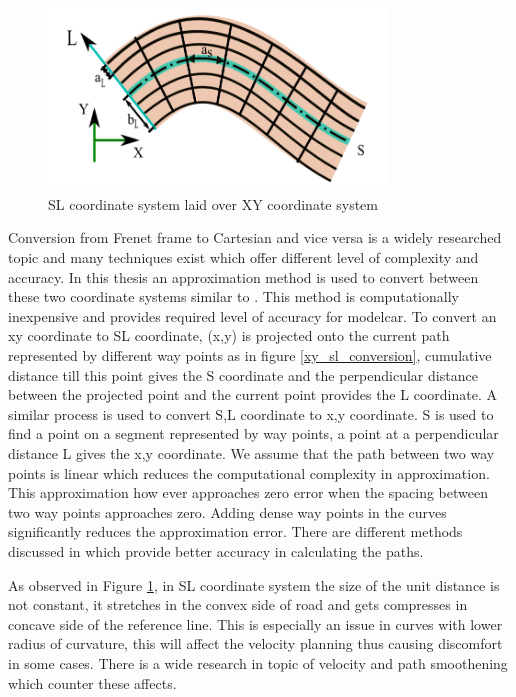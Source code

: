  \begin{figure}[H]
    \centering
    \includegraphics[width=0.8\textwidth]{Images/sl_over_xy.png}
    \caption{SL coordinate system laid over XY coordinate system}
    \label{sl_over_xy}
\end{figure}
 
 Conversion from Frenet frame to Cartesian and vice versa is a widely researched topic and many techniques exist which offer different level of complexity and accuracy. In this thesis an approximation method is used to convert between these two coordinate systems similar to \cite{volvo_reactive_traj}. This method is computationally inexpensive and provides required level of accuracy for modelcar. To convert an xy coordinate to SL coordinate, (x,y) is projected onto the current path represented by different way points as in figure \ref{xy_sl_conversion}, cumulative distance till this point gives the S coordinate and the perpendicular distance between the projected point and the current point provides the L coordinate. A similar process is used to convert S,L coordinate to x,y coordinate. S is used to find a point on a segment represented by way points, a point at a perpendicular distance L gives the x,y coordinate. We assume that the path between two way points is linear which reduces the computational complexity in approximation. This approximation how ever approaches zero error when the spacing between two way points approaches zero. Adding dense way points in the curves significantly reduces the approximation error. There are different methods discussed in \cite{lengthparameterized} \cite{Wangrobustand} which provide better accuracy in calculating the paths. 
 
 As observed in Figure \ref{sl_over_xy}, in SL coordinate system the size of the unit distance is not constant, it stretches in the convex side of road and gets compresses in concave side of the reference line. This is especially an issue in curves with lower radius of curvature, this will affect the velocity planning thus causing discomfort in some cases. There is a wide research in topic of velocity and path smoothening which counter these affects.
 
